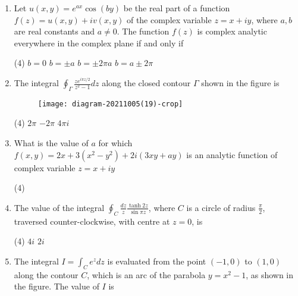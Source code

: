 \begin{enumerate}[label=\color{ocre}\textbf{\arabic*.}]
	{}
	\begin{tasks}(4)
		\task[\textbf{C.}] $\frac{-8}{\sqrt{3}}$
		\task[\textbf{D.}] $-\tanh \left(\frac{1}{2}\right)$
	\end{tasks}
	\item  Let $u(x, y)=e^{a x} \cos (b y)$ be the real part of a function $f(z)=u(x, y)+i v(x, y)$ of the complex variable $z=x+i y$, where $a, b$ are real constants and $a \neq 0 .$ The function $f(z)$ is complex analytic everywhere in the complex plane if and only if
	{}
	\begin{tasks}(4)
		\task[\textbf{A.}] $b=0$
		\task[\textbf{B.}] $b=\pm a$
		\task[\textbf{C.}] $b=\pm 2 \pi a$
		\task[\textbf{D.}]  $b=a \pm 2 \pi$
	\end{tasks}
	\item  The integral $\oint_{\Gamma} \frac{z e^{i \pi z / 2}}{z^{2}-1} d z$ along the closed contour $\Gamma$ shown in the figure is
	{}
	\begin{figure}[H]
		\centering
		\texttt{[image: diagram-20211005(19)-crop]}
	\end{figure}
	\begin{tasks}(4)
		\task[\textbf{B.}] $2 \pi$
		\task[\textbf{C.}] $-2 \pi$
		\task[\textbf{D.}] $4 \pi i$
	\end{tasks}
	\item What is the value of $a$ for which $f(x, y)=2 x+3\left(x^{2}-y^{2}\right)+2 i(3 x y+a y)$ is an analytic function of complex variable $z=x+i y$
	{}
	\begin{tasks}(4)
	\end{tasks}
\item  The value of the integral $\oint_{C} \frac{d z}{z} \frac{\tanh 2 z}{\sin \pi z}$, where $C$ is a circle of radius $\frac{\pi}{2}$, traversed counter-clockwise, with centre at $z=0$, is
{}
\begin{tasks}(4)
	\task[\textbf{B.}] $4 i$
	\task[\textbf{C.}] $2 i$
\end{tasks}
	\item The integral $I=\int_{C} e^{z} d z$ is evaluated from the point $(-1,0)$ to $(1,0)$ along the contour $C$, which is an arc of the parabola $y=x^{2}-1$, as shown in the figure. The value of $I$ is

\end{enumerate}
